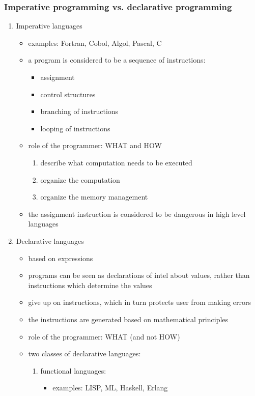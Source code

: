 \documentclass[11pt]{article}
\begin{document}
\subsubsection{Imperative programming vs. declarative programming}
\label{sec:org7f62409}
\begin{enumerate}
\item Imperative languages
\label{sec:org358fa51}
\begin{itemize}
\item examples: Fortran, Cobol, Algol, Pascal, C
\item a program is considered to be a sequence of instructions:
\begin{itemize}
\item assignment
\item control structures
\item branching of instructions
\item looping of instructions
\end{itemize}
\item role of the programmer: WHAT and HOW
\begin{enumerate}
\item describe what computation needs to be executed
\item organize the computation
\item organize the memory management
\end{enumerate}
\item the assignment instruction is considered to be dangerous in high level languages
\end{itemize}
\item Declarative languages
\label{sec:orgd17f99b}
\begin{itemize}
\item based on expressions
\item programs can be seen as declarations of intel about values, rather than instructions which
determine the values
\item give up on instructions, which in turn protects user from making errors
\item the instructions are generated based on mathematical principles
\item role of the programmer: WHAT (and not HOW)
\item two classes of declarative languages:
\begin{enumerate}
\item functional languages:
\begin{itemize}
\item examples: LISP, ML, Haskell, Erlang

\end{itemize}
\end{enumerate}
\end{itemize}
\end{enumerate}
\end{document}
